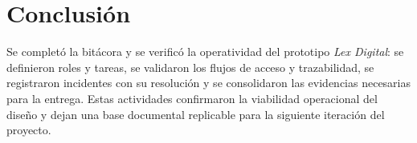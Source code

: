 \documentclass[
  spanish,
  letterpaper, oneside
]{article}
\begin{document}
\section{Conclusión}
Se completó la bitácora y se verificó la operatividad del prototipo \textit{Lex Digital}: se definieron roles y tareas, se validaron los flujos de acceso y trazabilidad, se registraron incidentes con su resolución y se consolidaron las evidencias necesarias para la entrega. Estas actividades confirmaron la viabilidad operacional del diseño y dejan una base documental replicable para la siguiente iteración del proyecto.

\clearpage
\nocite{bautista2016didactica,zambranoPilay2020tecnologias,conocer2025ec0554,cushpa2022pacie,pech2016manual,scjn2022protocolo}

\end{document}
